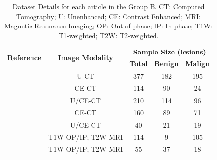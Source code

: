 \documentclass{article}
\begin{document}
\begin{table}[]
    \centering
    \begin{tabular}{ccccc}\toprule
        \multirow{2}{*}{\textbf{Reference}} & \multirow{2}{*}{\textbf{Image Modality}} & \multicolumn{3}{c}{\textbf{Sample Size (lesions)}}
        \\\cmidrule(lr){3-5}
                                            &                                          & \textbf{Total}                                     & \textbf{Benign} & \textbf{Malign} \\\midrule
        \cite{Shoemaker2018}                & U-CT                                     & 377                                                & 182             & 195             \\
        \cite{Koyuncu2019}                  & CE-CT                                    & 114                                                & 90              & 24              \\
        \cite{Li2019}                       & U/CE-CT                                  & 210                                                & 114             & 96              \\
        \cite{Andersen2021}                 & CE-CT                                    & 160                                                & 89              & 71              \\
        \cite{Moawad2021}                   & U/CE-CT                                  & 40                                                 & 21              & 19              \\
        \cite{Barstugan2020}                & T1W-OP/IP; T2W MRI                       & 114                                                & 9               & 105             \\
        \cite{Stanzione2021}                & T1W-OP/IP; T2W MRI                       & 55                                                 & 37              & 18              \\
        \bottomrule
    \end{tabular}
    \caption{Dataset Details for each article in the Group B. CT: Computed Tomography; U: Unenhanced; CE: Contrast Enhanced; MRI: Magnetic Resonance Imaging; OP: Out-of-phase; IP: In-phase; T1W: T1-weighted; T2W: T2-weighted.}
    \label{tab:data_B}
\end{table}
\end{document}
